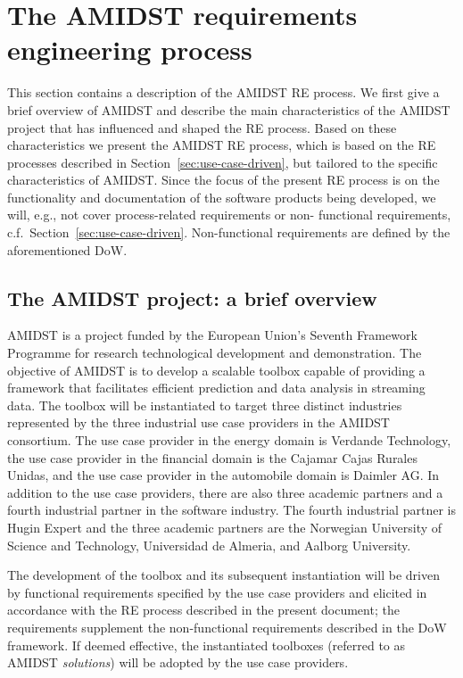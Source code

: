 \section{The AMIDST requirements engineering process}
\label{sec:AmidstRequirementProcess}

This section contains a description of the AMIDST RE process.  We first give a brief overview of AMIDST and describe the 
main characteristics of the AMIDST project that has influenced and shaped the RE process. Based on these characteristics 
we present the AMIDST RE process, which is based on the RE processes described in Section~\ref{sec:use-case-driven}, 
but tailored to the specific characteristics of AMIDST. Since the focus of the present RE process is on the functionality and 
documentation of the software products being developed, we will, e.g., not cover process-related requirements or non-
functional requirements, c.f.\ Section~\ref{sec:use-case-driven}. Non-functional requirements are defined by the
aforementioned DoW. 

\subsection{The AMIDST project: a brief overview}

AMIDST is a project funded by the European Union's Seventh Framework Programme for research technological development
and demonstration. The objective of AMIDST is to develop a scalable toolbox capable of providing a framework that
facilitates efficient prediction and data analysis in streaming data. The toolbox will be instantiated to target three
distinct industries represented by the three industrial use case providers in the AMIDST consortium. The use case
provider in the energy domain is Verdande Technology, the use case provider in the financial domain is the Cajamar Cajas
Rurales Unidas, and the use case provider in the automobile domain is Daimler AG.  In addition to the use case
providers, there are also three academic partners and a fourth industrial partner in the software industry.  The fourth
industrial partner is Hugin Expert and the three academic partners are the Norwegian University of Science and Technology, Universidad de Almeria, and Aalborg University.

The development of the toolbox and its subsequent instantiation will be driven by functional requirements specified by the use case providers and elicited in accordance with the RE process described in the present document; the requirements supplement the non-functional requirements described in the DoW framework. If deemed effective, the instantiated toolboxes (referred to as AMIDST \emph{solutions}) will be adopted by the use case providers. 

